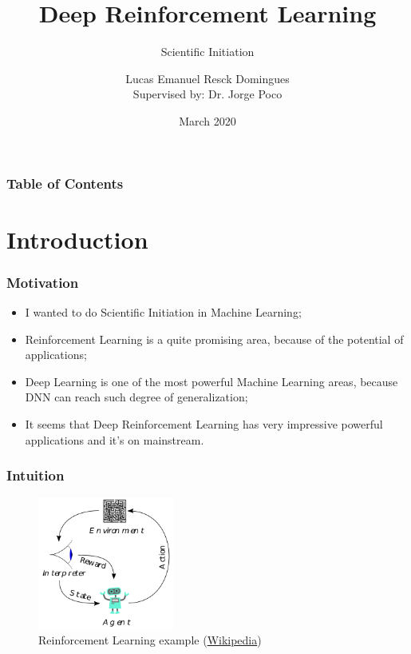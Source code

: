 \documentclass{beamer}
\title[Deep Reinforcement Learning]{Deep Reinforcement Learning}
\subtitle{Scientific Initiation}
\author[Domingues]{Lucas Emanuel Resck Domingues \\
    {\small Supervised by: Dr. Jorge Poco}}
\institute[FGV]
{
  Escola de Matemática Aplicada \\
  Fundação Getulio Vargas
}
\date[2020]
{March 2020}
\begin{document}
    \frame{\titlepage}

    \begin{frame}
        \frametitle{Table of Contents}
        \tableofcontents
    \end{frame}

    \section{Introduction}

        \begin{frame}
            \frametitle{Motivation}

            \begin{itemize}
                \item I wanted to do Scientific Initiation in Machine Learning;
                \item Reinforcement Learning is a quite promising area, because of the potential of applications;
                \item Deep Learning is one of the most powerful Machine Learning areas, because DNN can reach such degree of generalization;
                \item It seems that Deep Reinforcement Learning has very impressive powerful applications and it's on mainstream.
            \end{itemize}

        \end{frame}

        \begin{frame}
            \frametitle{Intuition}

            \begin{figure}
                \centering
                \includegraphics[width=0.4\textwidth]{figures/rl.png}
                \caption{Reinforcement Learning example (\href{https://en.wikipedia.org/wiki/Reinforcement_learning}{Wikipedia})}
                \label{fig14:rl}
            \end{figure}

        \end{frame}
\end{document}
